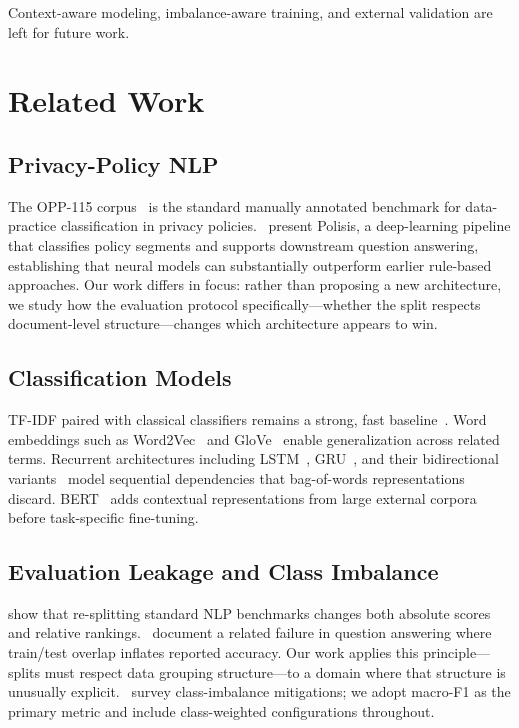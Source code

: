 \documentclass[11pt]{article}
\begin{document}
Context-aware modeling, imbalance-aware training, and external validation are left for future work.

\section{Related Work}

\subsection{Privacy-Policy NLP}

The OPP-115 corpus~\cite{wilson-etal-2016-creation} is the standard manually annotated benchmark for data-practice classification in privacy policies.\ \citet{harkous-etal-2018-polisis} present Polisis, a deep-learning pipeline that classifies policy segments and supports downstream question answering, establishing that neural models can substantially outperform earlier rule-based approaches. Our work differs in focus: rather than proposing a new architecture, we study how the evaluation protocol specifically—whether the split respects document-level structure—changes which architecture appears to win.

\subsection{Classification Models}

TF-IDF paired with classical classifiers remains a strong, fast baseline~\cite{pedregosa-etal-2011-scikit}. Word embeddings such as Word2Vec~\cite{mikolov-etal-2013-efficient} and GloVe~\cite{pennington-etal-2014-glove} enable generalization across related terms. Recurrent architectures including LSTM~\cite{hochreiter-schmidhuber-1997-lstm}, GRU~\cite{cho-etal-2014-learning}, and their bidirectional variants~\cite{schuster-paliwal-1997-bidirectional} model sequential dependencies that bag-of-words representations discard. BERT~\cite{devlin-etal-2019-bert} adds contextual representations from large external corpora before task-specific fine-tuning.

\subsection{Evaluation Leakage and Class Imbalance}

\citet{gorman-bedrick-2019-need} show that re-splitting standard NLP benchmarks changes both absolute scores and relative rankings.\ \citet{lewis-etal-2021-question} document a related failure in question answering where train/test overlap inflates reported accuracy. Our work applies this principle---splits must respect data grouping structure---to a domain where that structure is unusually explicit.\ \citet{johnson-khoshgoftaar-2019-survey} survey class-imbalance mitigations; we adopt macro-F1 as the primary metric and include class-weighted configurations throughout.
\end{document}

